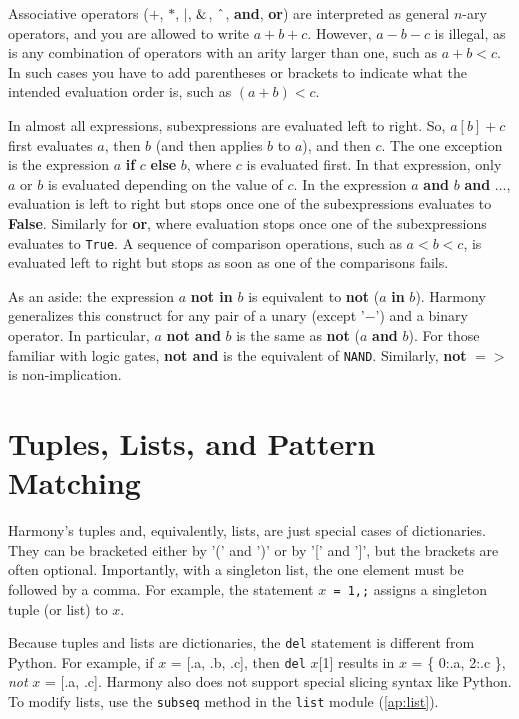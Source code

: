 \documentclass{report}
\begin{document}
Associative operators ($+$, $*$, $|$, $\string&$, $\string^$, \textbf{and}, \textbf{or})
are interpreted as general $n$-ary operators, and you are allowed to write
$a + b + c$.  However, $a - b - c$ is illegal, as is any combination of operators with an
arity larger than one, such as $a + b < c$.
In such cases you have to add parentheses or brackets to indicate what
the intended evaluation order is, such as $(a + b) < c$.

In almost all expressions, subexpressions are evaluated left to right.
So, $a[b] + c$
first evaluates $a$, then $b$ (and then applies $b$ to $a$), and then $c$.  The one
exception is the expression $a$ \textbf{if} $c$ \textbf{else} $b$, where $c$ is evaluated
first.  In that expression, only $a$ or $b$ is evaluated depending on the value of $c$.
In the expression $a$ \textbf{and} $b$ \textbf{and} $...$, evaluation is left
to right but stops once one of the subexpressions evaluates to \textbf{False}.
Similarly for \textbf{or}, where evaluation stops once one of the subexpressions
evaluates to \texttt{True}.
A sequence of comparison operations, such as $a < b < c$, is evaluated left to right
but stops as soon as one of the comparisons fails.

As an aside:
the expression $a$ \textbf{not in} $b$ is equivalent to \textbf{not} ($a$ \textbf{in} $b$).
Harmony generalizes this construct for any pair of a unary (except '$-$') and a binary operator.
In particular, $a$ \textbf{not and} $b$ is the same as \textbf{not} ($a$ \textbf{and} $b$).  
For those familiar with logic gates, \textbf{not and} is the equivalent of \texttt{NAND}.
Similarly, \textbf{not} \texttt{$=>$} is non-implication.

\section{Tuples, Lists, and Pattern Matching}

Harmony's tuples and, equivalently, lists, are just special cases of dictionaries.
They can be bracketed either by '(' and ')' or by '[' and ']', but
the brackets are often optional.  Importantly, with a singleton list, the
one element must be followed by a comma.
For example, the statement \texttt{$x$ = 1,;} assigns a singleton tuple (or list) to $x$.

Because tuples and lists are dictionaries, the \texttt{del} statement is
different from Python.  For example, if $x$ = [.a, .b, .c], then
\texttt{del} $x$[1] results in $x$ = \{ 0:.a, 2:.c \}, \emph{not}
$x$ = [.a, .c].
Harmony also does not support special slicing syntax like Python.
To modify lists, use the \texttt{subseq} method in the \texttt{list} module
(\autoref{ap:list}).
\end{document}

